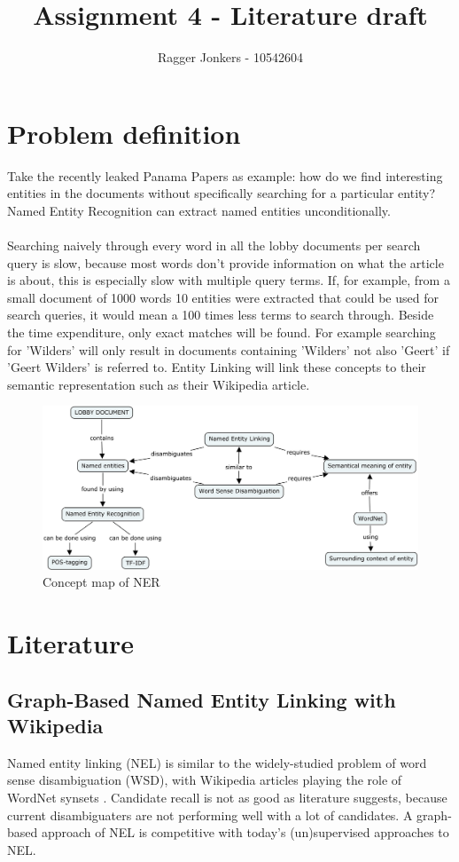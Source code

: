 \documentclass{article}
\title{Assignment 4 - Literature draft}
\author{Ragger Jonkers - 10542604}
\begin{document}
\maketitle

\section*{Problem definition}
Take the recently leaked Panama Papers as example: how do we find interesting entities in the documents without specifically searching for a particular entity? Named Entity Recognition can extract named entities unconditionally. \\\\
Searching naively through every word in all the lobby documents per search query is slow, because most words don't provide information on what the article is about, this is especially slow with multiple query terms. If, for example, from a small document of 1000 words 10 entities were extracted that could be used for search queries, it would mean a 100 times less terms to search through. Beside the time expenditure, only exact matches will be found. For example searching for 'Wilders' will only result in documents containing 'Wilders' not also 'Geert' if 'Geert Wilders' is referred to. Entity Linking will link these concepts to their semantic representation such as their Wikipedia article.


\begin{figure}
    \centering
    \includegraphics[scale=0.18]{Figures/ner}
    \caption{Concept map of NER}
    \label{fig:ner}
\end{figure}

\section*{Literature}
\subsection*{Graph-Based Named Entity Linking with Wikipedia}
Named entity linking (NEL) is similar to the widely-studied problem of word sense disambiguation (WSD), with Wikipedia articles playing the role of WordNet synsets \cite{hachey2011graph}. Candidate recall is not as good as literature suggests, because current disambiguaters are not performing well with a lot of candidates. A graph-based approach of NEL is competitive with today's (un)supervised approaches to NEL.
\end{document}
